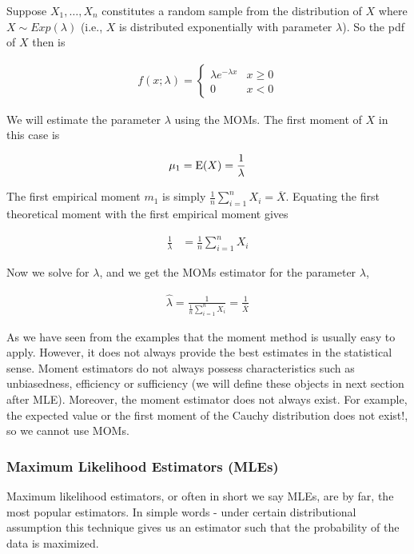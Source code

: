 \documentclass[ 11pt,%
				a4paper,%
				twoside,%
				headinclude,%
				footinclude = true,%
				cleardoublepage = empty,%
				reqno]{scrbook}
\begin{document}
\begin{example}
Suppose $X_1, \ldots, X_n$ constitutes a random sample from the distribution of $X$ where  $X \sim Exp(\lambda) $ (i.e., $X$ is distributed exponentially with parameter $\lambda$). So the pdf of $X$ then is

\begin{align*}
  f(x ; \lambda)=\left\{\begin{array}{ll}\lambda e^{-\lambda x} & x \geq 0 \\ 0 & x<0\end{array}\right.
\end{align*}

We will estimate the parameter $\lambda$ using the MOMs. The first moment of $X$ in this case is

\begin{align*}
\mu_{1} = \text{E}(X) = \frac{1}{\lambda}
\end{align*}

The first empirical moment $m_1$ is simply $\frac{1}{n} \sum_{i=1}^{n}{X_i} = \overline{X}$. Equating the first theoretical moment with the first empirical moment gives

\begin{align*}
\frac{1}{\lambda} & = \frac{1}{n} \sum_{i=1}^{n}{X_i} 
\end{align*}

Now we solve for $\lambda$, and we get the MOMs estimator for the parameter $\lambda$,  


\begin{align*}
\hat{\lambda}= \frac{1}{\frac{1}{n} \sum_{i=1}^{n}{X_i} } =\frac{1}{\bar{X}}
\end{align*} 
\end{example}


\begin{remark}

As we have seen from the examples that the moment method is usually easy to apply. However, it does not always provide the best estimates in the statistical sense. Moment estimators do not always possess characteristics such as unbiasedness, efficiency or sufficiency (we will define these objects in next section after MLE). Moreover, the moment estimator does not always exist. For example, the expected value or the first moment of the Cauchy distribution does not exist!, so we cannot use MOMs.


\end{remark}


\subsubsection{Maximum Likelihood Estimators (MLEs)}
Maximum likelihood estimators, or often in short we say MLEs, are by far, the most popular estimators. In simple words - under certain distributional assumption this technique gives us an estimator such that the probability of the data is maximized.  
\end{document}
